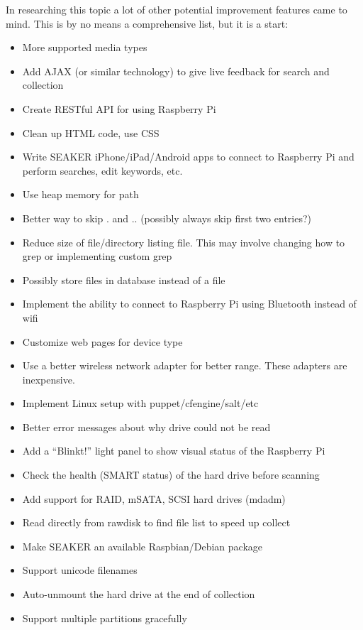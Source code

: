 \documentclass[12pt]{article}
\begin{document}
In researching this topic a lot of other potential improvement features
came to mind.  This is by no means a comprehensive list, but it is a start:

\vspace{0.5 cm}
\begin{itemize}
  \item More supported media types
  \item Add AJAX (or similar technology) to give live feedback for search and collection
  \item Create RESTful API for using Raspberry Pi
  \item Clean up HTML code, use CSS
  \item Write SEAKER iPhone/iPad/Android apps to connect to Raspberry Pi and perform searches, edit keywords, etc.
  \item Use heap memory for path
  \item Better way to skip . and .. (possibly always skip first two entries?)
  \item Reduce size of file/directory listing file. This may involve changing how to grep or implementing custom grep
  \item Possibly store files in database instead of a file
  \item Implement the ability to connect to Raspberry Pi using Bluetooth instead of \gls{wifi}
  \item Customize web pages for device type
  \item Use a better wireless network adapter for better range. These adapters are inexpensive.
  \item Implement Linux setup with puppet/cfengine/salt/etc
  \item Better error messages about why drive could not be read
  \item Add a “Blinkt!” light panel to show visual status of the Raspberry Pi
  \item Check the health (SMART status) of the hard drive before scanning
  \item Add support for RAID, mSATA, SCSI hard drives (mdadm)
  \item Read directly from rawdisk to find file list to speed up collect
  \item Make SEAKER an available Raspbian/Debian package
  \item Support unicode filenames
  \item Auto-unmount the hard drive at the end of collection
  \item Support multiple partitions gracefully

\end{itemize}
\end{document}
